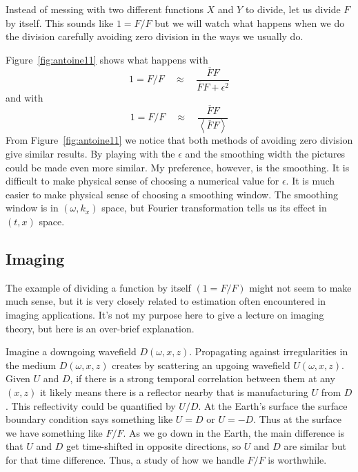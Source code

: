 \par
Instead of messing with two different functions $X$ and $Y$ to divide,
let us divide $F$ by itself.
This sounds like $1=F/F$ but we will
watch what happens when we do the division carefully
avoiding zero division in the ways we usually do.
\par
Figure~\ref{fig:antoine11} shows
what happens with
\begin{equation}
\label{eqn:z7}
1 = F/F \quad \approx \quad \frac{\overline{F}F}{\overline{F}F+\epsilon^2}
\end{equation}
and with
\begin{equation}
\label{eqn:z8}
1 = F/F \quad \approx\quad  \frac{\overline{F}F}{\left< \overline{F}F \right>}
\end{equation}
%
%
From Figure~\ref{fig:antoine11} we notice that both methods of
avoiding zero division give similar results.
By playing with the $\epsilon$ and the smoothing width
the pictures could be made even more similar.
My preference, however, is the smoothing.
It is difficult to make physical sense of choosing a numerical value
for $\epsilon$.
It is much easier to make physical sense of choosing a smoothing window.
The smoothing window is in $(\omega,k_x)$ space,
but Fourier transformation tells us its effect in $(t,x)$ space.


\subsection{Imaging}
The example of dividing a function by itself $(1=F/F)$ might not
seem to make much sense, but it is very closely related to estimation
often encountered in imaging applications.
It's not my purpose here to give a lecture on imaging theory, but
here is an over-brief explanation.
\par
Imagine a downgoing wavefield $D(\omega,x,z)$. Propagating against irregularities in  the medium $D(\omega, x , z )$
creates by scattering  an upgoing wavefield $U(\omega,x,z)$.
Given $U$ and $D$, if there is a strong temporal correlation between them
at any $(x,z)$ it likely means there is a reflector nearby that is
manufacturing $U$ from $D$.
This reflectivity could be quantified by $U/D$.
At the Earth's surface the surface boundary condition says something like
$U=D$ or $U=-D$.   Thus at the surface we have something like $F/F$.
As we go down in the Earth, the main difference is that $U$ and $D$ get
time-shifted in opposite directions, so $U$ and $D$ are similar but
for that time difference.  Thus, a study of how we handle $F/F$ is worthwhile.

